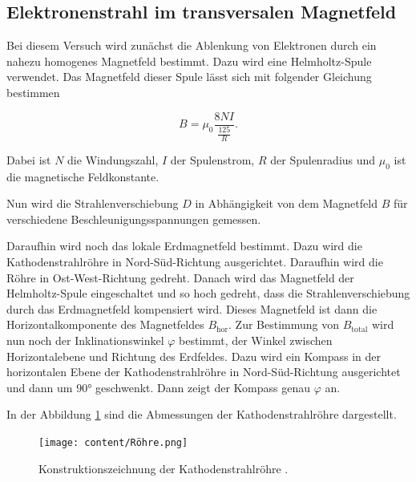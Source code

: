 \subsection{Elektronenstrahl im transversalen Magnetfeld}

Bei diesem Versuch wird zunächst die Ablenkung von Elektronen durch ein nahezu homogenes
Magnetfeld bestimmt. Dazu wird eine Helmholtz-Spule verwendet. Das Magnetfeld dieser
Spule lässt sich mit folgender Gleichung bestimmen

\begin{equation}
  B = \mu_0 \frac{8 N I}{\frac{125} R}.
  \label{eq:4}
\end{equation}

Dabei ist $N$ die Windungszahl, $I$ der Spulenstrom, $R$ der Spulenradius und
$\mu_0$ ist die magnetische Feldkonstante.

Nun wird die Strahlenverschiebung $D$ in Abhängigkeit von dem Magnetfeld $B$ für verschiedene
Beschleunigungsspannungen gemessen.

Daraufhin wird noch das lokale Erdmagnetfeld bestimmt. Dazu wird die Kathodenstrahlröhre
in Nord-Süd-Richtung ausgerichtet. Daraufhin wird die Röhre in Ost-West-Richtung gedreht.
Danach wird das Magnetfeld der Helmholtz-Spule eingeschaltet und so hoch gedreht, dass
die Strahlenverschiebung durch das Erdmagnetfeld kompensiert wird. Dieses Magnetfeld ist dann
die Horizontalkomponente des Magnetfeldes $B_\text{hor}$.
Zur Bestimmung von $B_\text{total}$ wird nun noch der Inklinationswinkel $\varphi$
bestimmt, der Winkel zwischen Horizontalebene und Richtung des Erdfeldes. Dazu wird
ein Kompass in der horizontalen Ebene der Kathodenstrahlröhre in Nord-Süd-Richtung ausgerichtet
und dann um $90°$ geschwenkt. Dann zeigt der Kompass genau $\varphi$ an.


In der Abbildung \ref{abb:5} sind die Abmessungen der Kathodenstrahlröhre dargestellt.

\begin{figure}[H]
  \centering
  \texttt{[image: content/Röhre.png]}
  \caption{Konstruktionszeichnung der Kathodenstrahlröhre \cite{1}.}
  \label{abb:5}
\end{figure}
